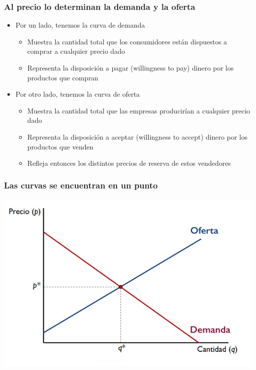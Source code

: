 \documentclass{beamer}
\begin{document}
\begin{frame}
\frametitle{Al precio lo determinan la demanda y la oferta}
\begin{itemize}
    \item Por un lado, tenemos la curva de demanda
    \begin{itemize}
        \item Muestra la cantidad total que los consumidores están dispuestos a comprar a cualquier precio dado
        \item Representa la disposición a pagar (willingness to pay) dinero por los productos que compran
    \end{itemize}
    \vspace{2mm}
    \item Por otro lado, tenemos la curva de oferta
    \begin{itemize}
        \item Muestra la cantidad total que las empresas producirían a cualquier precio dado
        \item Representa la disposición a aceptar (willingness to accept) dinero por los productos que venden
        \item Refleja entonces los distintos precios de reserva de estos vendedores
        \end{itemize}
\end{itemize}
\end{frame}

\begin{frame}
\frametitle{Las curvas se encuentran en un punto}
\includegraphics[scale=0.6]{Slides Principios de Economia/Figures/Tema_07.3_equilibrioofertademanda_0.jpg}
\end{frame}
\end{document}
